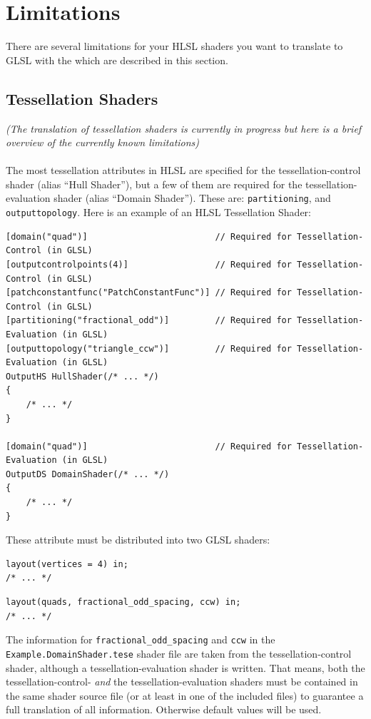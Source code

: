 \documentclass{article}
\begin{document}

\newpage
\section{Limitations}

There are several limitations for your HLSL shaders you want to translate to GLSL with the \XSC
which are described in this section.

\subsection{Tessellation Shaders}

\emph{(The translation of tessellation shaders is currently in progress but here is a brief overview
of the currently known limitations)}
\\
\\
The most tessellation attributes in HLSL are specified for the tessellation-control shader (alias ``Hull Shader''),
but a few of them are required for the tessellation-evaluation shader (alias ``Domain Shader'').
These are: \texttt{partitioning}, and \texttt{outputtopology}. Here is an example of an HLSL Tessellation Shader:
\begin{lstlisting}[title={\texttt{Example.hlsl}}]
[domain("quad")]                         // Required for Tessellation-Control (in GLSL)
[outputcontrolpoints(4)]                 // Required for Tessellation-Control (in GLSL)
[patchconstantfunc("PatchConstantFunc")] // Required for Tessellation-Control (in GLSL)
[partitioning("fractional_odd")]         // Required for Tessellation-Evaluation (in GLSL)
[outputtopology("triangle_ccw")]         // Required for Tessellation-Evaluation (in GLSL)
OutputHS HullShader(/* ... */)
{
	/* ... */
}

[domain("quad")]                         // Required for Tessellation-Evaluation (in GLSL)
OutputDS DomainShader(/* ... */)
{
	/* ... */
}
\end{lstlisting}
These attribute must be distributed into two GLSL shaders:
\begin{lstlisting}[title={\texttt{Example.HullShader.tesc}}]
layout(vertices = 4) in;
/* ... */
\end{lstlisting}
\begin{lstlisting}[title={\texttt{Example.DomainShader.tese}}]
layout(quads, fractional_odd_spacing, ccw) in;
/* ... */
\end{lstlisting}
The information for \texttt{fractional\_odd\_spacing} and \texttt{ccw} in the \texttt{Example.DomainShader.tese} shader file
are taken from the tessellation-control shader, although a tessellation-evaluation shader is written.
That means, both the tessellation-control- \emph{and} the tessellation-evaluation shaders must be contained
in the same shader source file (or at least in one of the included files) to guarantee a full translation of all information.
Otherwise default values will be used.
\end{document}
